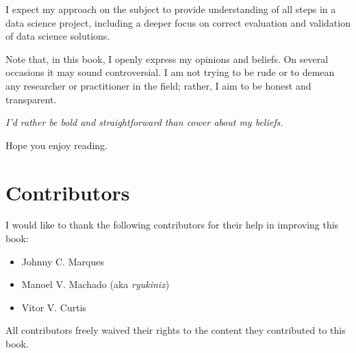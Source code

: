 I expect my approach on the subject to provide understanding of all steps in a data
science project, including a deeper focus on correct evaluation and validation of data
science solutions.

Note that, in this book, I openly express my opinions and beliefs. On several occasions it
may sound controversial.  I am not trying to be rude or to demean any researcher or
practitioner in the field; rather, I aim to be honest and transparent.

\vspace{1em}
\emph{I'd rather be bold and straightforward than cower about my beliefs.}
\vspace{1em}

Hope you enjoy reading.

\section*{Contributors}

I would like to thank the following contributors for their help in improving this book:

\begin{itemize}
  \itemsep0em
  \item Johnny C. Marques
  \item Manoel V. Machado (aka \emph{ryukinix})
  \item Vitor V. Curtis
\end{itemize}

All contributors freely waived their rights to the content they contributed to this book.
